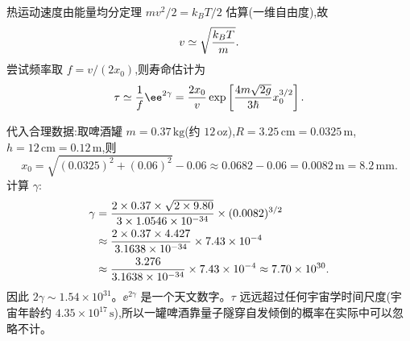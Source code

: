 \begin{question}
\begin{solution}
热运动速度由能量均分定理 $mv^2/2=k_BT/2$ 估算(一维自由度),故
\[
v\simeq\sqrt{k_BT\over m}.
\]
尝试频率取 $f=v/(2x_0)$,则寿命估计为
\[
\tau\simeq{1\over f}\ee^{2\gamma}
={2x_0\over v}\exp\left[{4m\sqrt{2g}\over3\hbar}x_0^{3/2}\right].
\]

代入合理数据:取啤酒罐 $m=0.37\,\mathrm{kg}$(约 $12\,\mathrm{oz}$),$R=3.25\,\mathrm{cm}=0.0325\,\mathrm{m}$,$h=12\,\mathrm{cm}=0.12\,\mathrm{m}$,则
\[
x_0=\sqrt{(0.0325)^2+(0.06)^2}-0.06\approx0.0682-0.06=0.0082\,\mathrm{m}=8.2\,\mathrm{mm}.
\]
计算 $\gamma$:
\[
\begin{aligned}\gamma={}&{2\times0.37\times\sqrt{2\times9.80}\over3\times1.0546\times10^{-34}}\times(0.0082)^{3/2}\\\approx{}&{2\times0.37\times4.427\over3.1638\times10^{-34}}\times7.43\times10^{-4}\\\approx{}&{3.276\over3.1638\times10^{-34}}\times7.43\times10^{-4}\approx 7.70\times10^{30}.\end{aligned}
\]
因此 $2\gamma\sim1.54\times10^{31}$。$\ee^{2\gamma}$ 是一个天文数字。$\tau$ 远远超过任何宇宙学时间尺度(宇宙年龄约 $4.35\times10^{17}\,\mathrm{s}$),所以一罐啤酒靠量子隧穿自发倾倒的概率在实际中可以忽略不计。
\end{solution}
\end{question}

